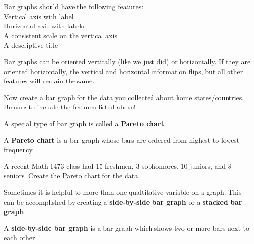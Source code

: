 \documentclass[notes]{subfiles}
\begin{document}
		\begin{rmk}
			Bar graphs should have the following features:\\[15pt]
			\tabitem Vertical axis with label\\[15pt]
			\tabitem Horizontal axis with labels\\[15pt]
			\tabitem A consistent scale on the vertical axis \\[15pt]
			\tabitem A descriptive title			
		\end{rmk}

		\begin{rmk}[Note]
			Bar graphs can be oriented vertically (like we just did) or horizontally.  If they are oriented horizontally, the vertical and horizontal information flips, but all other features will remain the same.
		\end{rmk}

		\begin{ex}
			Now create a bar graph for the data you collected about home states/countries.  Be sure to include the features listed above!
		\end{ex}
			\newpage
		A special type of bar graph is called a \textbf{Pareto chart}.

		\begin{defn}
			A \textbf{Pareto chart} is a bar graph whose bars are ordered from highest to lowest frequency.
		\end{defn}

		\begin{ex}
			A recent Math 1473 class had 15 freshmen, 3 sophomores, 10 juniors, and 8 seniors.  Create the Pareto chart for the data.
		\end{ex}

		Sometimes it is helpful to more than one qualtitative variable on a graph.  This can be accomplished by creating a \textbf{side-by-side bar graph} or a \textbf{stacked bar graph}.

		\begin{defn}
			A \textbf{side-by-side bar graph} is a bar graph which shows two or more bars next to each other 
		\end{defn}
		\newpage
\end{document}
